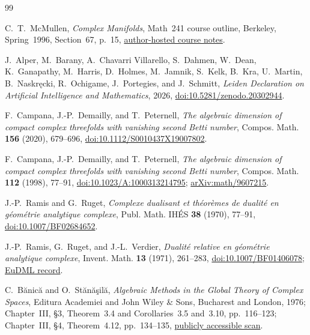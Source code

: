 \begin{thebibliography}{99}

C.~T.~McMullen,
\emph{Complex Manifolds}, Math~241 course outline, Berkeley,
Spring~1996, Section~67, p.~15,
\href{https://people.math.harvard.edu/~ctm/home/text/class/berkeley/241/96/course/course.pdf}%
{author-hosted course notes}.

J.~Alper, M.~Barany, A.~Chavarri Villarello, S.~Dahmen, W.~Dean,
K.~Ganapathy, M.~Harris, D.~Holmes, M.~Jamnik, S.~Kelk, B.~Kra,
U.~Martin, B.~Naskr\k{e}cki, R.~Ochigame, J.~Portegies, and J.~Schmitt,
\emph{Leiden Declaration on Artificial Intelligence and Mathematics},
2026,
\href{https://doi.org/10.5281/zenodo.20302944}{doi:10.5281/zenodo.20302944}.

F.~Campana, J.-P.~Demailly, and T.~Peternell,
\emph{The algebraic dimension of compact complex threefolds with vanishing
second Betti number},
Compos. Math. \textbf{156} (2020), 679--696,
\href{https://doi.org/10.1112/S0010437X19007802}{doi:10.1112/S0010437X19007802}.

F.~Campana, J.-P.~Demailly, and T.~Peternell,
\emph{The algebraic dimension of compact complex threefolds with vanishing
second Betti number},
Compos. Math. \textbf{112} (1998), 77--91,
\href{https://doi.org/10.1023/A:1000313214795}{doi:10.1023/A:1000313214795};
\href{https://arxiv.org/abs/math/9607215}{arXiv:math/9607215}.

J.-P.~Ramis and G.~Ruget,
\emph{Complexe dualisant et th\'eor\`emes de dualit\'e en g\'eom\'etrie
analytique complexe},
Publ. Math. IH\'ES \textbf{38} (1970), 77--91,
\href{https://doi.org/10.1007/BF02684652}{doi:10.1007/BF02684652}.

J.-P.~Ramis, G.~Ruget, and J.-L.~Verdier,
\emph{Dualit\'e relative en g\'eom\'etrie analytique complexe},
Invent. Math. \textbf{13} (1971), 261--283,
\href{https://doi.org/10.1007/BF01406078}{doi:10.1007/BF01406078};
\href{https://eudml.org/doc/142096}{EuDML record}.

C.~B\u{a}nic\u{a} and O.~St\u{a}n\u{a}\c{s}il\u{a},
\emph{Algebraic Methods in the Global Theory of Complex Spaces},
Editura Academiei and John Wiley \& Sons, Bucharest and London, 1976;
  Chapter~III, \S3, Theorem~3.4 and Corollaries~3.5 and~3.10, pp.~116--123;
  Chapter~III, \S4, Theorem~4.12, pp.~134--135,
  \href{https://djvu.online/file/2hQiOnz8WuoQk}{publicly accessible scan}.


\end{thebibliography}
